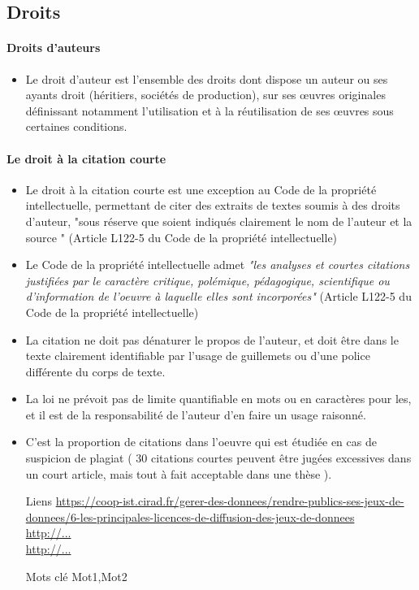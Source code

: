 \documentclass{book}
\newenvironment{titlemize}[1]{%
  \paragraph{#1}
  \begin{itemize}}
  {\end{itemize}}
\begin{document}
\subsection{Droits}
\begin{titlemize}{Droits d'auteurs}
    \item Le droit d’auteur est l’ensemble des droits dont dispose un auteur ou ses ayants droit (héritiers, sociétés de production), sur ses œuvres originales définissant notamment l'utilisation et à la réutilisation de ses œuvres sous certaines conditions.
\end{titlemize}
\begin{titlemize}{Le droit à la citation courte}\label{droit_citation_courte}
    \item Le droit à la citation courte est une exception au Code de la propriété intellectuelle, permettant de citer des extraits de textes soumis à des droits d'auteur, "sous réserve que soient indiqués clairement le nom de l'auteur et la source " (Article L122-5 du Code de la propriété intellectuelle)
    \item Le Code de la propriété intellectuelle admet \textit{"les analyses et courtes citations justifiées par le caractère critique, polémique, pédagogique, scientifique ou d'information de l'oeuvre à laquelle elles sont incorporées"}  (Article L122-5 du Code de la propriété intellectuelle)
    \item La citation ne doit pas dénaturer le propos de l'auteur, et doit être dans le texte clairement identifiable par l'usage de guillemets ou d'une police différente du corps de texte.
    \item La loi ne prévoit pas de limite quantifiable en mots ou en caractères pour les, et il est de la responsabilité de l'auteur d'en faire un usage raisonné.
    \item C'est la proportion de citations dans l'oeuvre qui est étudiée en cas de suspicion de plagiat ( 30 citations courtes peuvent être jugées excessives dans un court article, mais tout à fait acceptable dans une thèse ).  
    
\end{titlemize}
\begin{itemize}
    \item [Liens]
        \url{https://coop-ist.cirad.fr/gerer-des-donnees/rendre-publics-ses-jeux-de-donnees/6-les-principales-licences-de-diffusion-des-jeux-de-donnees}\\
        \url{http://...}\\
        \url{http://...}\\
    \item [Mots clé]
        \gls{Mot1},\gls{Mot2}
\end{itemize}
\end{document}
